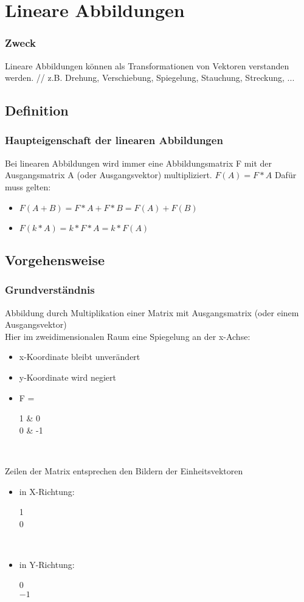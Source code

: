 \section{Lineare Abbildungen}
\begin{frame}
    \frametitle{Zweck}
    Lineare Abbildungen können als Transformationen von Vektoren verstanden werden. //
    z.B. Drehung, Verschiebung, Spiegelung, Stauchung, Streckung, ...
\end{frame}

\subsection{Definition}

\begin{frame}
	\frametitle{Haupteigenschaft der linearen Abbildungen}
	Bei linearen Abbildungen wird immer eine Abbildungsmatrix F mit der Ausgangsmatrix A (oder Ausgangsvektor) multipliziert. $F(A)=F*A$
	\newline
	Dafür muss gelten:
	\begin{itemize}
		\item $F(A+B)= F*A+F*B = F(A)+F(B)$
		\item $F(k*A)= k*F*A = k*F(A)$
	\end{itemize}
\end{frame}

\subsection{Vorgehensweise}

\begin{frame}
	\frametitle{Grundverständnis}
	Abbildung durch Multiplikation einer Matrix mit Ausgangsmatrix (oder einem Ausgangsvektor) \\
	Hier im zweidimensionalen Raum eine Spiegelung an der x-Achse:
	\begin{itemize}
		\item x-Koordinate bleibt unverändert
		\item y-Koordinate wird negiert
		\item F = \begin{pmatrix}
			1 & 0 \\
			0 & -1
			\end{pmatrix} \\
		\end{itemize}
		Zeilen der Matrix entsprechen den Bildern der Einheitsvektoren
		\begin{itemize}
		\item in X-Richtung: \begin{pmatrix}
			1 \\
			0 
			\end{pmatrix} \\
		\item in Y-Richtung: \begin{pmatrix}
			0 \\
			$-1$
			\end{pmatrix} \\
	\end{itemize}
\end{frame}

